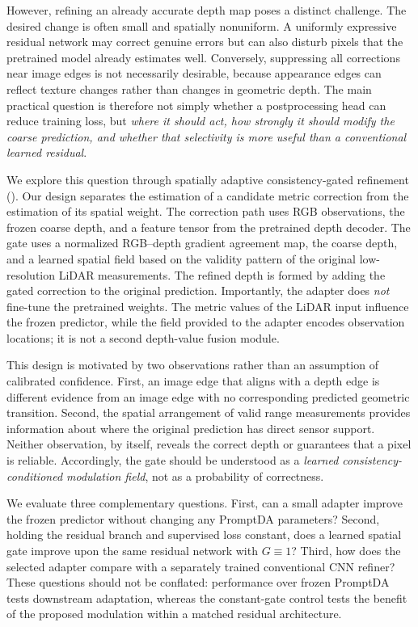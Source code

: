 However, refining an already accurate depth map poses a distinct challenge. The desired change is often small and spatially nonuniform. A uniformly expressive residual network may correct genuine errors but can also disturb pixels that the pretrained model already estimates well. Conversely, suppressing all corrections near image edges is not necessarily desirable, because appearance edges can reflect texture changes rather than changes in geometric depth. The main practical question is therefore not simply whether a postprocessing head can reduce training loss, but \emph{where it should act, how strongly it should modify the coarse prediction, and whether that selectivity is more useful than a conventional learned residual}.

We explore this question through spatially adaptive consistency-gated refinement (\method). Our design separates the estimation of a candidate metric correction from the estimation of its spatial weight. The correction path uses RGB observations, the frozen coarse depth, and a feature tensor from the pretrained depth decoder. The gate uses a normalized RGB--depth gradient agreement map, the coarse depth, and a learned spatial field based on the validity pattern of the original low-resolution LiDAR measurements. The refined depth is formed by adding the gated correction to the original prediction. Importantly, the adapter does \emph{not} fine-tune the pretrained weights. The metric values of the LiDAR input influence the frozen predictor, while the field provided to the adapter encodes observation locations; it is not a second depth-value fusion module.

This design is motivated by two observations rather than an assumption of calibrated confidence. First, an image edge that aligns with a depth edge is different evidence from an image edge with no corresponding predicted geometric transition. Second, the spatial arrangement of valid range measurements provides information about where the original prediction has direct sensor support. Neither observation, by itself, reveals the correct depth or guarantees that a pixel is reliable. Accordingly, the gate should be understood as a \emph{learned consistency-conditioned modulation field}, not as a probability of correctness.

We evaluate three complementary questions. First, can a small adapter improve the frozen predictor without changing any PromptDA parameters? Second, holding the residual branch and supervised loss constant, does a learned spatial gate improve upon the same residual network with $G\equiv1$? Third, how does the selected adapter compare with a separately trained conventional CNN refiner? These questions should not be conflated: performance over frozen PromptDA tests downstream adaptation, whereas the constant-gate control tests the benefit of the proposed modulation within a matched residual architecture.

